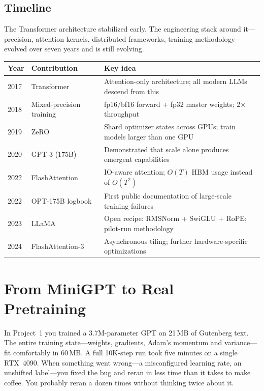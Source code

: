 \subsection*{Timeline}

The Transformer architecture stabilized early. The engineering stack around it---precision, attention kernels, distributed frameworks, training methodology---evolved over seven years and is still evolving.

\begin{center}
\begin{tabularx}{\textwidth}{@{}lp{3.8cm}X@{}}
\toprule
Year & Contribution & Key idea \\
\midrule
2017 & Transformer~\cite{vaswani2017attention} & Attention-only architecture; all modern LLMs descend from this \\
2018 & Mixed-precision training & fp16/bf16 forward + fp32 master weights; 2$\times$ throughput \\
2019 & ZeRO~\cite{rajbhandari2020zero} & Shard optimizer states across GPUs; train models larger than one GPU \\
2020 & GPT-3 (175B) & Demonstrated that scale alone produces emergent capabilities \\
2022 & FlashAttention~\cite{dao2022flashattention} & IO-aware attention; $O(T)$ HBM usage instead of $O(T^2)$ \\
2022 & OPT-175B logbook~\cite{zhang2022opt} & First public documentation of large-scale training failures \\
2023 & LLaMA~\cite{touvron2023llama} & Open recipe: RMSNorm + SwiGLU + RoPE; pilot-run methodology \\
2024 & FlashAttention-3 & Asynchronous tiling; further hardware-specific optimizations \\
\bottomrule
\end{tabularx}
\end{center}


\section{From MiniGPT to Real Pretraining}
\label{sec:scale-gap}

In Project~1 you trained a 3.7M-parameter GPT on 21\,MB of Gutenberg text. The entire training state---weights, gradients, Adam's momentum and variance---fit comfortably in 60\,MB. A full 10K-step run took five minutes on a single RTX~4090. When something went wrong---a misconfigured learning rate, an unshifted label---you fixed the bug and reran in less time than it takes to make coffee. You probably reran a dozen times without thinking twice about it.


